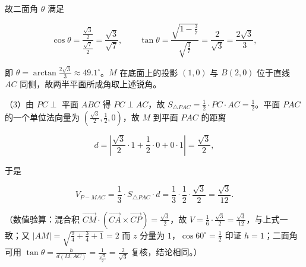 \begin{answer}
故二面角 $\theta$ 满足

\nopagebreak[4]
\[\cos\theta=\frac{\frac{\sqrt3}{2}}{\frac{\sqrt7}{2}}=\frac{\sqrt3}{\sqrt7},\qquad \tan\theta=\frac{\sqrt{1-\frac37}}{\sqrt{\frac37}}=\frac{2}{\sqrt3}=\frac{2\sqrt3}{3},\]

即 $\theta=\arctan\frac{2\sqrt3}{3}\approx49.1^\circ$。$M$ 在底面上的投影 $(1,0)$ 与 $B(2,0)$ 位于直线 $AC$ 同侧，故两半平面所成角取上述锐角。

（3）由 $PC\perp$ 平面 $ABC$ 得 $PC\perp AC$，故 $S_{\triangle PAC}=\frac12\cdot PC\cdot AC=\frac12$。平面 $PAC$ 的一个单位法向量为 $\left(\frac{\sqrt3}{2},\frac12,0\right)$，故 $M$ 到平面 $PAC$ 的距离

\nopagebreak[4]
\[d=\left|\frac{\sqrt3}{2}\cdot1+\frac12\cdot0+0\cdot1\right|=\frac{\sqrt3}{2},\]

于是

\nopagebreak[4]
\[V_{P-MAC}=\frac13\cdot S_{\triangle PAC}\cdot d=\frac13\cdot\frac12\cdot\frac{\sqrt3}{2}=\frac{\sqrt3}{12}.\]

（数值验算：混合积 $\overrightarrow{CM}\cdot\left(\overrightarrow{CA}\times\overrightarrow{CP}\right)=\frac{\sqrt3}{2}$，故 $V=\frac16\cdot\frac{\sqrt3}{2}=\frac{\sqrt3}{12}$，与上式一致；又 $|AM|=\sqrt{\frac94+\frac34+1}=2$ 而 $z$ 分量为 $1$，$\cos60^\circ=\frac12$ 印证 $h=1$；二面角可用 $\tan\theta=\frac{h}{d(M,AC)}=\frac{1}{\frac{\sqrt3}{2}}=\frac{2}{\sqrt3}$ 复核，结论相同。）


\end{answer}
